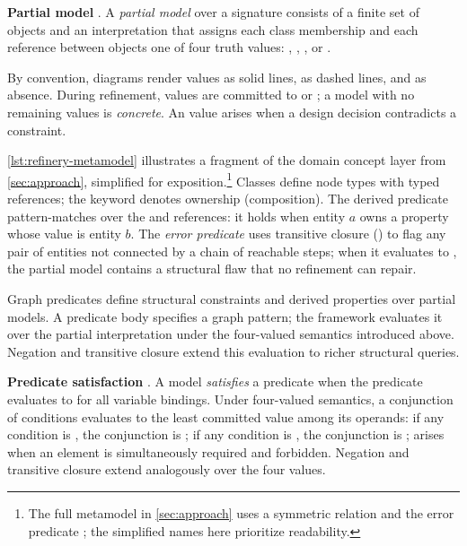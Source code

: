\textbf{Partial model} \citep{marussy_refinery_2024}. A \emph{partial model} over a signature consists of a finite set of objects and an interpretation that assigns each class membership and each reference between objects one of four truth values: , , , or .

By convention, diagrams render  values as solid lines,  as dashed lines, and  as absence. During refinement,  values are committed to  or ; a model with no remaining  values is \emph{concrete}. An  value arises when a design decision contradicts a constraint.


\autoref{lst:refinery-metamodel} illustrates a fragment of the domain concept layer from \autoref{sec:approach}, simplified for exposition.\footnote{The full metamodel in \autoref{sec:approach} uses a symmetric  relation and the error predicate ; the simplified names here prioritize readability.} Classes define node types with typed references; the  keyword denotes ownership (composition). The derived predicate  pattern-matches over the  and  references: it holds when entity \(a\) owns a property whose value is entity \(b\). The \emph{error predicate}  uses transitive closure () to flag any pair of entities not connected by a chain of reachable steps; when it evaluates to , the partial model contains a structural flaw that no refinement can repair.

Graph predicates define structural constraints and derived properties over partial models. A predicate body specifies a graph pattern; the framework evaluates it over the partial interpretation under the four-valued semantics introduced above. Negation and transitive closure extend this evaluation to richer structural queries.

\textbf{Predicate satisfaction} \citep{marussy_refinery_2024}. A model \emph{satisfies} a predicate when the predicate evaluates to  for all variable bindings. Under four-valued semantics, a conjunction of conditions evaluates to the least committed value among its operands: if any condition is , the conjunction is ; if any condition is , the conjunction is ;  arises when an element is simultaneously required and forbidden. Negation and transitive closure extend analogously over the four values.

